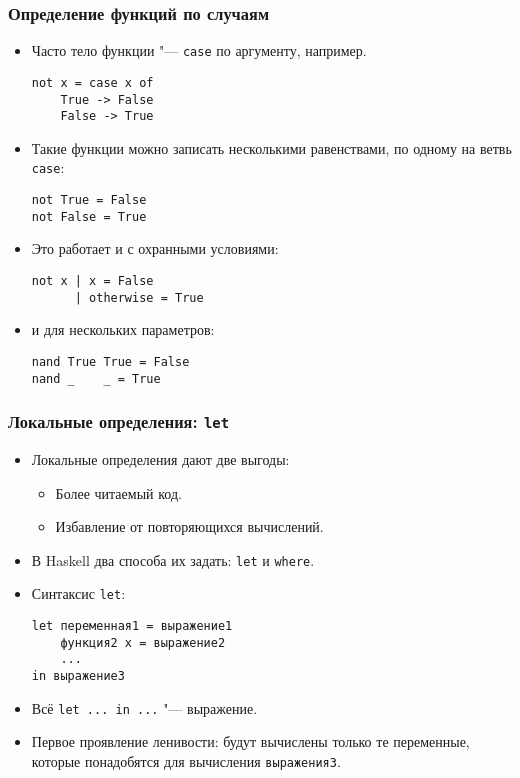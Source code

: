 \documentclass[10pt]{beamer}
\begin{document}
\begin{frame}[fragile]
  \frametitle{Определение функций по случаям}
  \begin{itemize}
    \item Часто тело функции "--- \lstinline|case| по аргументу, например.
          \begin{lstlisting}[basicstyle=\ttfamily\small]
not x = case x of
    True -> False
    False -> True
\end{lstlisting}
    \item Такие функции можно записать несколькими равенствами, по одному на ветвь \lstinline|case|:
          \begin{lstlisting}[basicstyle=\ttfamily\small]
not True = False
not False = True
\end{lstlisting}
    \item Это работает и с охранными условиями:
          \begin{lstlisting}[basicstyle=\ttfamily\small]
not x | x = False
      | otherwise = True
\end{lstlisting}
    \item и для нескольких параметров:
          \begin{lstlisting}[basicstyle=\ttfamily\small]
nand True True = False
nand _    _ = True
\end{lstlisting}
  \end{itemize}
\end{frame}

\begin{frame}[fragile]
  \frametitle{Локальные определения: \lstinline[basicstyle=\ttfamily]|let|}
  \begin{itemize}
    \item Локальные определения дают две выгоды:
          \begin{itemize}
            \item Более читаемый код.
            \item Избавление от повторяющихся вычислений.
          \end{itemize}
    \item В Haskell два способа их задать: \lstinline|let| и \lstinline|where|.
    \item Синтаксис \lstinline|let|:
          \begin{lstlisting}
let переменная1 = выражение1
    функция2 x = выражение2
    ...
in выражение3
\end{lstlisting}
    \item Всё \lstinline|let ... in ...| "--- выражение.
    \item Первое проявление ленивости: будут вычислены только те переменные, которые понадобятся для вычисления \lstinline|выражения3|.
  \end{itemize}
\end{frame}
\end{document}
